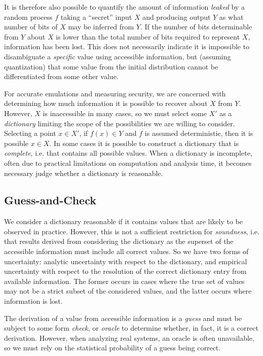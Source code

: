 It is therefore also possible to quantify the amount of information \emph{leaked} by a random process $f$ taking a ``secret'' input $X$ and producing output $Y$ as what number of bits of $X$ may be inferred from $Y$.
If the number of bits determinable from $Y$ about $X$ is lower than the total number of bits required to represent $X$, information has been lost.
This does not necessarily indicate it is impossible to disambiguate a \emph{specific} value using accessible information, but (assuming quantization) that some value from the initial distribution cannot be differentiated from some other value.

For accurate emulations and measuring security, we are concerned with determining how much information it is possible to recover about $X$ from $Y$.
However, $X$ is inaccessible in many cases, so we must select some $X'$ as a \emph{dictionary} limiting the scope of the possibilities we are willing to consider.
Selecting a point $x \in X'$, if $f(x) \in Y$ and $f$ is assumed deterministic, then it is possible $x \in X$.
In some cases it is possible to construct a dictionary that is \emph{complete}, i.e. that contains all possible values.
When a dictionary is incomplete, often due to practical limitations on computation and analysis time, it becomes necessary judge whether a dictionary is reasonable.

\subsection{Guess-and-Check}

We consider a dictionary reasonable if it contains values that are likely to be observed in practice.
However, this is not a sufficient restriction for \emph{soundness}, i.e. that results derived from considering the dictionary as the superset of the accessible information must include all correct values.
So we have two forms of uncertainty: analytic uncertainty with respect to the dictionary, and empirical uncertainty with respect to the resolution of the correct dictionary entry from available information.
The former occurs in cases where the true set of values may not be a strict subset of the considered values, and the latter occurs where information is lost.

The derivation of a value from accessible information is a \emph{guess} and must be subject to some form \emph{check}, or \emph{oracle} to determine whether, in fact, it is a correct derivation.
However, when analyzing real systems, an oracle is often unavailable, so we must rely on the statistical probability of a guess being correct.

